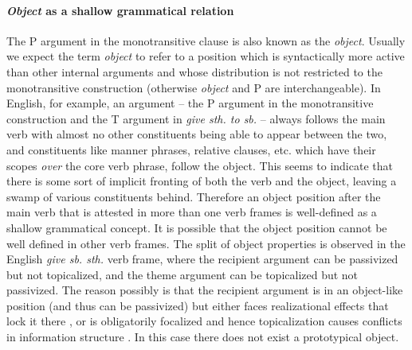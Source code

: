 \documentclass[a4paper, oneside, 12pt]{report}
\newcommand*{\term}[1]{\emph{#1}}
\newcommand{\form}[1]{\emph{#1}}
\begin{document}
\paragraph*{\term{Object} as a shallow grammatical relation}
\label{sec:grammatical.clause.internal.object}
The P argument in the monotransitive clause is also known as the \term{object}.
Usually we expect the term \term{object} to refer to a position 
which is syntactically more active than other internal arguments
and whose distribution is not restricted to the monotransitive construction
(otherwise \term{object} and P are interchangeable).
In English, for example,
an argument -- the P argument in the monotransitive construction 
and the T argument in \form{give sth. to sb.} --
always follows the main verb with almost no other constituents
being able to appear between the two,
and constituents like manner phrases, relative clauses, etc.
which have their scopes \emph{over} the core verb phrase, follow the object.
This seems to indicate that there is some sort of implicit fronting 
of both the verb and the object,
leaving a swamp of various constituents behind.
Therefore an object position after the main verb
that is attested in more than one verb frames is well-defined
as a shallow grammatical concept.
It is possible that the object position cannot be well defined in other verb frames. 
The split of object properties is observed in the English \form{give sb. sth.} verb frame,
where the recipient argument can be passivized but not topicalized,
and the theme argument can be topicalized but not passivized.
The reason possibly is that the recipient argument is in an object-like position
(and thus can be passivized)
but either faces realizational effects that lock it there 
\citep{oba2005double},
or is obligatorily focalized and hence topicalization causes conflicts in information structure
\citep{im2005alternative}.
In this case there does not exist a prototypical object.
\end{document}
